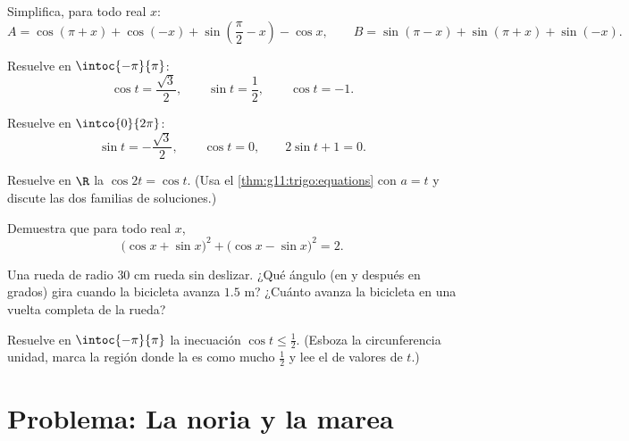 \begin{exercise}[$\star\star$]\label{exo:g11:trigo:5}
Simplifica, para todo real $x$:
\[
A = \cos(\pi + x) + \cos(-x) + \sin\left(\frac\pi2 - x\right) - \cos x,
\qquad
B = \sin(\pi - x) + \sin(\pi + x) + \sin(-x) .
\]
\end{exercise}

\begin{exercise}[$\star\star$]\label{exo:g11:trigo:6}
Resuelve en $\intoc{-\pi}{\pi}$:
\[
\cos t = \frac{\sqrt3}{2}, \qquad
\sin t = \frac12, \qquad
\cos t = -1 .
\]
\end{exercise}

\begin{exercise}[$\star\star$]\label{exo:g11:trigo:7}
Resuelve en $\intco{0}{2\pi}$:
\[
\sin t = -\frac{\sqrt3}{2}, \qquad
\cos t = 0, \qquad
2\sin t + 1 = 0 .
\]
\end{exercise}

\begin{exercise}[$\star\star$]\label{exo:g11:trigo:8}
Resuelve en $\R$ la  $\cos 2t = \cos t$. (Usa el
\cref{thm:g11:trigo:equations} con $a = t$ y discute las dos familias de
soluciones.)
\end{exercise}

\begin{exercise}[$\star\star$]\label{exo:g11:trigo:9}
Demuestra que para todo real $x$,
\[
\bigl(\cos x + \sin x\bigr)^2 + \bigl(\cos x - \sin x\bigr)^2 = 2 .
\]
\end{exercise}

\begin{exercise}[$\star\star$]\label{exo:g11:trigo:10}
Una rueda de radio $30$ cm rueda sin deslizar. ¿Qué ángulo (en  y
después en grados) gira cuando la bicicleta avanza $1.5$ m? ¿Cuánto avanza
la bicicleta en una vuelta completa de la rueda?
\end{exercise}

\begin{exercise}[$\star\star\star$]\label{exo:g11:trigo:11}
Resuelve en $\intoc{-\pi}{\pi}$ la inecuación $\cos t \leq \frac12$.
(Esboza la circunferencia unidad, marca la región donde la  es como
mucho $\frac12$ y lee el  de valores de $t$.)
\end{exercise}

\section{Problema: La noria y la marea}

